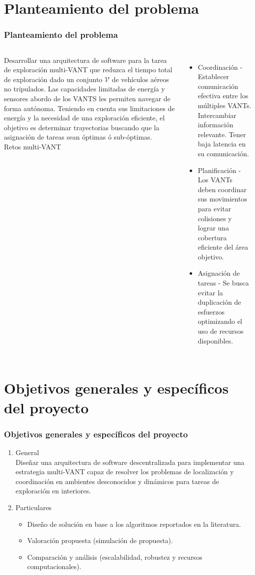 \documentclass[
  24pt, %
  aspectratio=169, %
]{beamer}
\begin{document}
\section{Planteamiento del problema}
\begin{frame}
  \frametitle{Planteamiento del problema}
  \begin{columns}
    \justifying
    \small Desarrollar una arquitectura de software para la tarea de exploración multi-VANT que reduzca el tiempo total de exploración dado un conjunto $\mathcal{V}$ de vehículos aéreos no tripulados. Las capacidades limitadas de energía y sensores abordo de los VANTS les permiten navegar de forma autónoma. Teniendo en cuenta sus limitaciones de energía y la necesidad de una exploración eficiente, el objetivo es determinar trayectorias buscando que la asignación de tareas sean óptimas ó sub-óptimas.
    \\
    \pause
    \centering
    \small Retos multi-VANT
    \begin{itemize}
    \small \item Coordinación - Establecer comunicación efectiva entre los múltiples VANTs. Intercambiar información relevante. Tener baja latencia en su comunicación.
    \small \item Planificación - Los VANTs deben coordinar sus movimientos para evitar colisiones y lograr una cobertura eficiente del área objetivo.
    \small \item Asignación de tareas - Se busca evitar la duplicación de esfuerzos optimizando el uso de recursos disponibles.
    \end{itemize}
  \end{columns}
\end{frame}

\section{Objetivos generales y específicos del proyecto}
\begin{frame}
  \frametitle{Objetivos generales y específicos del proyecto}
  \begin{enumerate}
  \item<1-> General \\
    Diseñar una arquitectura de software descentralizada para implementar una estrategia multi-VANT capaz de resolver los problemas de localización y coordinación en ambientes desconocidos y dinámicos para tareas de exploración en interiores.
    \pause
  \item<2-> Particulares\\
    \begin{itemize}
    \item Diseño de solución en base a los algoritmos reportados en la literatura.
      \pause
    \item Valoración propuesta (simulación de propuesta).
      \pause
    \item Comparación y análisis (escalabilidad, robustez y recursos computacionales).
    \end{itemize}
  \end{enumerate}
\end{frame}
\end{document}
